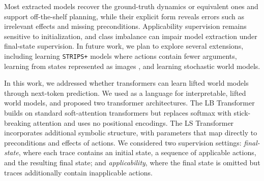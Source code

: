 Most extracted models recover the ground-truth dynamics or equivalent ones and support off-the-shelf planning, while their explicit form reveals errors such as irrelevant effects and missing preconditions.
Applicability supervision remains sensitive to initialization, and class imbalance can impair model extraction under final-state supervision.
In future work, we plan to explore several extensions, including learning \texttt{STRIPS+} models \citep{jansen2025incomplete} where actions contain fewer arguments, learning from states represented as images \citep{xi2024neuro,xi2026unsupervised}, and learning stochastic world models.






\iffalse
    In this work, we addressed whether transformers can learn lifted world models through next-token prediction.
    We used \strips as a language for interpretable, lifted world models, and proposed two transformer architectures.
    The LB Transformer builds on standard soft-attention transformers but replaces softmax with stick-breaking attention and uses no positional encodings.
    The LS Transformer incorporates additional symbolic structure, with parameters that map directly to preconditions and effects of \strips actions.
    We considered two supervision settings: \textit{final-state}, where each trace contains an initial state, a sequence of applicable actions, and the resulting final state; and \textit{applicability}, where the final state is omitted but traces additionally contain inapplicable actions.
    
